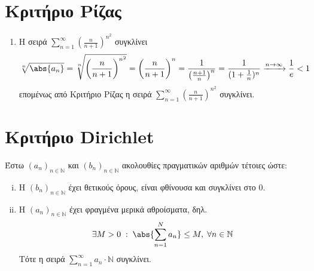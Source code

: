 \documentclass[main.tex]{subfiles}
\begin{document}
\section{Κριτήριο Ρίζας}


\begin{examples}
\item {}
    \begin{enumerate}
        \item Η σειρά $ \sum_{n=1}^{\infty} \left(\frac{n}{n+1} \right)^{n^{2}} $ 
            συγκλίνει
            \[
                \sqrt[n]{\abs{a_{n}}} = \sqrt[n]{\left(\frac{n}{n+1} \right)^{n^{2}}} 
                = \left(\frac{n}{n+1}\right)^{n} = \frac{1}{\left(\frac{n+1}{n} 
                \right)^{n}} = \frac{1}{(1+ \frac{1}{n})^{n}} \xrightarrow{n \to \infty}
                \frac{1}{e} <1
            \] 
            επομένως από Κριτήριο Ρίζας η σειρά 
            $ \sum_{n=1}^{\infty} \left(\frac{n}{n+1} \right)^{n^{2}} $ συγκλίνει.
    \end{enumerate}
\end{examples}

\section{Κριτήριο Dirichlet}

Έστω $ {(a_{n})}_{n \in \mathbb{N}} $ και $ (b_{n})_{n \in \mathbb{N}} $ ακολουθίες 
πραγματικών αριθμών τέτοιες ώστε:
\begin{enumerate}[i)]
    \item Η $ (b_{n})_{n \in \mathbb{N}} $ έχει θετικούς όρους, είναι φθίνουσα και 
        συγκλίνει στο 0.
    \item Η $ {(a_{n})}_{n \in \mathbb{N}} $ έχει φραγμένα μερικά αθροίσματα, δηλ.
        \[
            \exists M>0 \; : \; \abs{\sum_{n=1}^{N} a_{n}} \leq M, \; 
            \forall n \in \mathbb{N} 
        \] 
        Τότε η σειρά $ \sum_{n=1}^{\infty} a_{n}\cdot \mathbb{N} $ συγκλίνει.
\end{enumerate}
\end{document}
